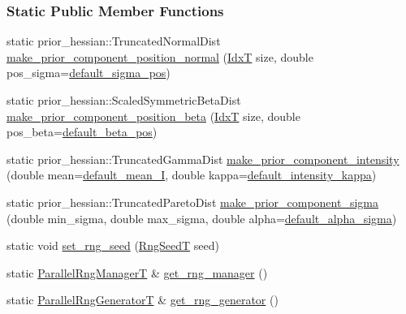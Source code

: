 \subsubsection*{Static Public Member Functions}
\begin{DoxyCompactItemize}
\item 
static prior\+\_\+hessian\+::\+Truncated\+Normal\+Dist \hyperlink{classmappel_1_1PointEmitterModel_ab99350cf74097c558f7a93b79e7a44c3}{make\+\_\+prior\+\_\+component\+\_\+position\+\_\+normal} (\hyperlink{namespacemappel_ab17ec0f30b61ece292439d7ece81d3a8}{IdxT} size, double pos\+\_\+sigma=\hyperlink{classmappel_1_1PointEmitterModel_aa98a73b9e3937c00b07596d3928df3ca}{default\+\_\+sigma\+\_\+pos})
\item 
static prior\+\_\+hessian\+::\+Scaled\+Symmetric\+Beta\+Dist \hyperlink{classmappel_1_1PointEmitterModel_ad4d563dd11df8c3daf83890374807185}{make\+\_\+prior\+\_\+component\+\_\+position\+\_\+beta} (\hyperlink{namespacemappel_ab17ec0f30b61ece292439d7ece81d3a8}{IdxT} size, double pos\+\_\+beta=\hyperlink{classmappel_1_1PointEmitterModel_a9b64c3b4b97ac2805340c0779c71398c}{default\+\_\+beta\+\_\+pos})
\item 
static prior\+\_\+hessian\+::\+Truncated\+Gamma\+Dist \hyperlink{classmappel_1_1PointEmitterModel_a4517e887a22007bd2e03650dcb853c92}{make\+\_\+prior\+\_\+component\+\_\+intensity} (double mean=\hyperlink{classmappel_1_1PointEmitterModel_a575dd30a0afb886db82ac725c8cc8df3}{default\+\_\+mean\+\_\+I}, double kappa=\hyperlink{classmappel_1_1PointEmitterModel_ad1f21ed3be543deed3c78a0494cb2984}{default\+\_\+intensity\+\_\+kappa})
\item 
static prior\+\_\+hessian\+::\+Truncated\+Pareto\+Dist \hyperlink{classmappel_1_1PointEmitterModel_a6fa9641db2d58329c5225e76427e3219}{make\+\_\+prior\+\_\+component\+\_\+sigma} (double min\+\_\+sigma, double max\+\_\+sigma, double alpha=\hyperlink{classmappel_1_1PointEmitterModel_a0d9f2c5438940f329e75708987e8b343}{default\+\_\+alpha\+\_\+sigma})
\item 
static void \hyperlink{classmappel_1_1PointEmitterModel_a046d5bd901c8dfde61f082c2634beec0}{set\+\_\+rng\+\_\+seed} (\hyperlink{namespacemappel_a318bca259a7add5979160939a3f4e60b}{Rng\+SeedT} seed)
\item 
static \hyperlink{namespacemappel_acf276a4212f07b1ed4cb2ddce379ba1d}{Parallel\+Rng\+ManagerT} \& \hyperlink{classmappel_1_1PointEmitterModel_ae876f0fa81613161a064452973bfb558}{get\+\_\+rng\+\_\+manager} ()
\item 
static \hyperlink{namespacemappel_ad1e99b214465229065d30f881a89d1cc}{Parallel\+Rng\+GeneratorT} \& \hyperlink{classmappel_1_1PointEmitterModel_af9f6630e9d496bb83e151f00522ecc2d}{get\+\_\+rng\+\_\+generator} ()
\end{DoxyCompactItemize}
